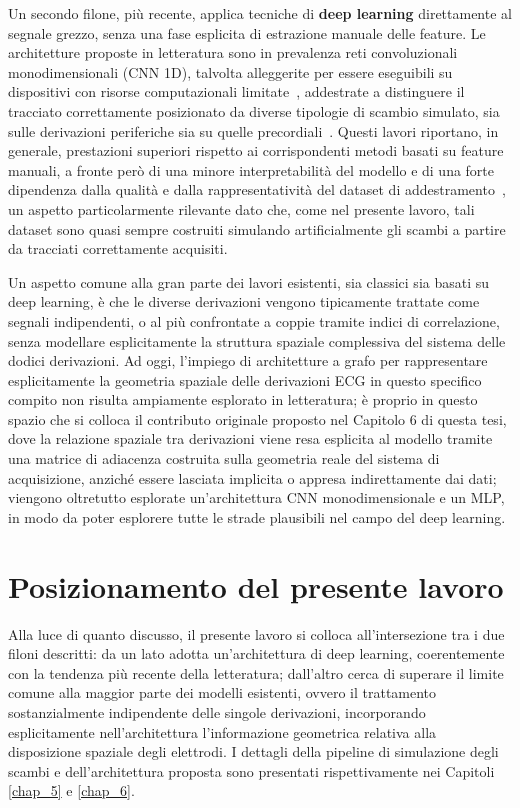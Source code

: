 Un secondo filone, più recente, applica tecniche di \textbf{deep learning} direttamente al segnale grezzo, senza una fase esplicita di estrazione manuale delle feature. Le architetture proposte in letteratura sono in prevalenza reti convoluzionali monodimensionali (CNN 1D), talvolta alleggerite per essere eseguibili su dispositivi con risorse computazionali limitate~\cite{huang2024lightweight}, addestrate a distinguere il tracciato correttamente posizionato da diverse tipologie di scambio simulato, sia sulle derivazioni periferiche sia su quelle precordiali~\cite{rjoob2021jmir, huang2024lightweight, alves2025telecardiology}. Questi lavori riportano, in generale, prestazioni superiori rispetto ai corrispondenti metodi basati su feature manuali, a fronte però di una minore interpretabilità del modello e di una forte dipendenza dalla qualità e dalla rappresentatività del dataset di addestramento~\cite{alves2025telecardiology}, un aspetto particolarmente rilevante dato che, come nel presente lavoro, tali dataset sono quasi sempre costruiti simulando artificialmente gli scambi a partire da tracciati correttamente acquisiti.

Un aspetto comune alla gran parte dei lavori esistenti, sia classici sia basati su deep learning, è che le diverse derivazioni vengono tipicamente trattate come segnali indipendenti, o al più confrontate a coppie tramite indici di correlazione, senza modellare esplicitamente la struttura spaziale complessiva del sistema delle dodici derivazioni. Ad oggi, l'impiego di architetture a grafo per rappresentare esplicitamente la geometria spaziale delle derivazioni ECG in questo specifico compito non risulta ampiamente esplorato in letteratura; è proprio in questo spazio che si colloca il contributo originale proposto nel Capitolo 6 di questa tesi, dove la relazione spaziale tra derivazioni viene resa esplicita al modello tramite una matrice di adiacenza costruita sulla geometria reale del sistema di acquisizione, anziché essere lasciata implicita o appresa indirettamente dai dati; viengono oltretutto esplorate un'architettura CNN monodimensionale e un MLP, in modo da poter esplorere tutte le strade plausibili nel campo del deep learning.

\section{Posizionamento del presente lavoro}

Alla luce di quanto discusso, il presente lavoro si colloca all'intersezione tra i due filoni descritti: da un lato adotta un'architettura di deep learning, coerentemente con la tendenza più recente della letteratura; dall'altro cerca di superare il limite comune alla maggior parte dei modelli esistenti, ovvero il trattamento sostanzialmente indipendente delle singole derivazioni, incorporando esplicitamente nell'architettura l'informazione geometrica relativa alla disposizione spaziale degli elettrodi. I dettagli della pipeline di simulazione degli scambi e dell'architettura proposta sono presentati rispettivamente nei Capitoli \ref{chap_5} e \ref{chap_6}.